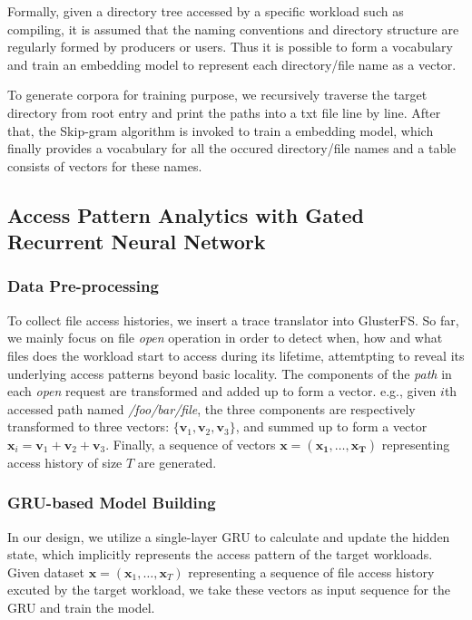 \documentclass[conference]{IEEEtran}
\begin{document}
Formally, given a directory tree accessed by a specific workload such as compiling, 
it is assumed that the naming conventions and directory structure are regularly formed by producers or users.
Thus it is possible to form a vocabulary and train an embedding model to represent each directory/file name as a vector.

To generate corpora for training purpose,
we recursively traverse the target directory from root entry and print the paths into a txt file line by line.
After that, the Skip-gram algorithm is invoked to train a embedding model, 
which finally provides a vocabulary for all the occured directory/file names and a table consists of vectors for these names.


\subsection{Access Pattern Analytics with Gated Recurrent Neural Network}
\subsubsection{Data Pre-processing}
To collect file access histories, we insert a trace translator into GlusterFS.
So far, we mainly focus on file \textit{open} operation in order to detect when, how and what files does the workload start to access during its lifetime,
attemtpting to reveal its underlying access patterns beyond basic locality. 
The components of the \textit{path} in each \textit{open} request are transformed and added up to form a vector.
e.g., given $i$th accessed path named \textit{/foo/bar/file}, the three components are respectively transformed to three vectors: $\{\mathbf{v}_1, \mathbf{v}_2, \mathbf{v}_3\}$,
and summed up to form a vector $\mathbf{x}_i = \mathbf{v}_1 + \mathbf{v}_2 + \mathbf{v}_3$.
Finally, a sequence of vectors $\mathbf{x}=(\mathbf{x_1}, \dots, \mathbf{x_T})$ representing access history of size $T$ are generated.

\subsubsection{GRU-based Model Building}
In our design, we utilize a single-layer GRU to calculate and update the hidden state, which implicitly represents the access pattern of the target workloads. 
Given dataset $\mathbf{x} = (\mathbf{x}_1,\dots,\mathbf{x}_T)$ representing a sequence of file access history excuted by the target workload, 
we take these vectors as input sequence for the GRU and train the model. 
\end{document}

